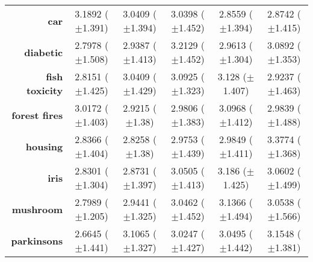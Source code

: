 \begin{table}[htbp]
{\begin{tabular}{r|ccccc}
			\textbf{car}                 & \cellcolor[rgb]{ .973,  .412,  .42}3.1892 ($\pm$1.391)  & \cellcolor[rgb]{ 1,  .922,  .518}3.0409 ($\pm$1.394)    & \cellcolor[rgb]{ 1,  .922,  .518}3.0398 ($\pm$1.452)    & \cellcolor[rgb]{ .388,  .745,  .482}2.8559 ($\pm$1.394) & \cellcolor[rgb]{ .447,  .761,  .482}2.8742 ($\pm$1.415) \\
			\textbf{diabetic}            & \cellcolor[rgb]{ .388,  .745,  .482}2.7978 ($\pm$1.508) & \cellcolor[rgb]{ .914,  .894,  .51}2.9387 ($\pm$1.413)  & \cellcolor[rgb]{ .973,  .412,  .42}3.2129 ($\pm$1.452)  & \cellcolor[rgb]{ 1,  .922,  .518}2.9613 ($\pm$1.304)    & \cellcolor[rgb]{ .988,  .663,  .471}3.0892 ($\pm$1.353) \\
			\textbf{fish toxicity}       & \cellcolor[rgb]{ .388,  .745,  .482}2.8151 ($\pm$1.425) & \cellcolor[rgb]{ 1,  .922,  .518}3.0409 ($\pm$1.429)    & \cellcolor[rgb]{ .984,  .62,  .463}3.0925 ($\pm$1.323)  & \cellcolor[rgb]{ .973,  .412,  .42}3.128 ($\pm$1.407)   & \cellcolor[rgb]{ .682,  .827,  .498}2.9237 ($\pm$1.463) \\
			\textbf{forest fires}        & \cellcolor[rgb]{ .992,  .773,  .49}3.0172 ($\pm$1.403)  & \cellcolor[rgb]{ .388,  .745,  .482}2.9215 ($\pm$1.38)  & \cellcolor[rgb]{ .965,  .91,  .514}2.9806 ($\pm$1.383)  & \cellcolor[rgb]{ .973,  .412,  .42}3.0968 ($\pm$1.412)  & \cellcolor[rgb]{ 1,  .922,  .518}2.9839 ($\pm$1.488)    \\
			\textbf{housing}             & \cellcolor[rgb]{ .431,  .757,  .482}2.8366 ($\pm$1.404) & \cellcolor[rgb]{ .388,  .745,  .482}2.8258 ($\pm$1.38)  & \cellcolor[rgb]{ 1,  .922,  .518}2.9753 ($\pm$1.439)    & \cellcolor[rgb]{ 1,  .91,  .518}2.9849 ($\pm$1.411)     & \cellcolor[rgb]{ .973,  .412,  .42}3.3774 ($\pm$1.368)  \\
			\textbf{iris}                & \cellcolor[rgb]{ .388,  .745,  .482}2.8301 ($\pm$1.304) & \cellcolor[rgb]{ .506,  .776,  .486}2.8731 ($\pm$1.397) & \cellcolor[rgb]{ 1,  .922,  .518}3.0505 ($\pm$1.413)    & \cellcolor[rgb]{ .973,  .412,  .42}3.186 ($\pm$1.425)   & \cellcolor[rgb]{ 1,  .886,  .514}3.0602 ($\pm$1.499)    \\
			\textbf{mushroom}            & \cellcolor[rgb]{ .388,  .745,  .482}2.7989 ($\pm$1.205) & \cellcolor[rgb]{ .745,  .847,  .502}2.9441 ($\pm$1.325) & \cellcolor[rgb]{ 1,  .922,  .518}3.0462 ($\pm$1.452)    & \cellcolor[rgb]{ .973,  .412,  .42}3.1366 ($\pm$1.494)  & \cellcolor[rgb]{ 1,  .882,  .51}3.0538 ($\pm$1.566)     \\
			\textbf{parkinsons}          & \cellcolor[rgb]{ .388,  .745,  .482}2.6645 ($\pm$1.441) & \cellcolor[rgb]{ .988,  .647,  .467}3.1065 ($\pm$1.327) & \cellcolor[rgb]{ .957,  .91,  .514}3.0247 ($\pm$1.427)  & \cellcolor[rgb]{ 1,  .922,  .518}3.0495 ($\pm$1.442)    & \cellcolor[rgb]{ .973,  .412,  .42}3.1548 ($\pm$1.381)  \\

\end{tabular}}
\end{table}
